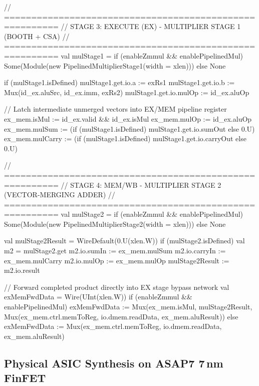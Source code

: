 \begin{chiselcode}[caption={Chisel implementation of the 2-stage pipelined multiplier, intermediate pipeline registers, and MEM/WB-to-EX forwarding in \texttt{RiscvPipelined.scala}.},label={lst:chisel_pipelined_mul}]
// ========================================================
// STAGE 3: EXECUTE (EX) - MULTIPLIER STAGE 1 (BOOTH + CSA)
// ========================================================
val mulStage1 = if (enableZmmul && enablePipelinedMul) 
  Some(Module(new PipelinedMultiplierStage1(width = xlen))) else None

if (mulStage1.isDefined) {
  mulStage1.get.io.a     := exRs1
  mulStage1.get.io.b     := Mux(id_ex.aluSrc, id_ex.imm, exRs2)
  mulStage1.get.io.mulOp := id_ex.aluOp
}

// Latch intermediate unmerged vectors into EX/MEM pipeline register
ex_mem.isMul    := id_ex.valid && id_ex.isMul
ex_mem.mulOp    := id_ex.aluOp
ex_mem.mulSum   := (if (mulStage1.isDefined) mulStage1.get.io.sumOut else 0.U)
ex_mem.mulCarry := (if (mulStage1.isDefined) mulStage1.get.io.carryOut else 0.U)

// ========================================================
// STAGE 4: MEM/WB - MULTIPLIER STAGE 2 (VECTOR-MERGING ADDER)
// ========================================================
val mulStage2 = if (enableZmmul && enablePipelinedMul) 
  Some(Module(new PipelinedMultiplierStage2(width = xlen))) else None

val mulStage2Result = WireDefault(0.U(xlen.W))
if (mulStage2.isDefined) {
  val m2 = mulStage2.get
  m2.io.sumIn   := ex_mem.mulSum
  m2.io.carryIn := ex_mem.mulCarry
  m2.io.mulOp   := ex_mem.mulOp
  mulStage2Result := m2.io.result
}

// Forward completed product directly into EX stage bypass network
val exMemFwdData = Wire(UInt(xlen.W))
if (enableZmmul && enablePipelinedMul) {
  exMemFwdData := Mux(ex_mem.isMul, mulStage2Result,
                  Mux(ex_mem.ctrl.memToReg, io.dmem.readData, ex_mem.aluResult))
} else {
  exMemFwdData := Mux(ex_mem.ctrl.memToReg, io.dmem.readData, ex_mem.aluResult)
}
\end{chiselcode}

\subsection{Physical ASIC Synthesis on ASAP7 7\,nm FinFET}

